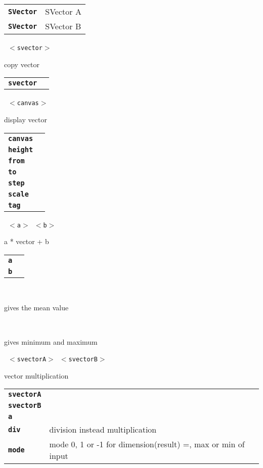 \begin{description}
\begin{description}
      \begin{tabular}{ll}
 \texttt{\textbf{SVector}} &  SVector A \\
 \texttt{\textbf{SVector}} &  SVector B \\
      \end{tabular}
       \texttt{ $<$svector$>$} \

        copy vector

      \begin{tabular}{ll}
 \texttt{\textbf{svector}} &  \\
      \end{tabular}
       \texttt{ $<$canvas$>$      } \

        display vector

      \begin{tabular}{ll}
 \texttt{\textbf{canvas}} &  \\
 \texttt{\textbf{height}} &    \\
 \texttt{\textbf{from}} &      \\
 \texttt{\textbf{to}} &        \\
 \texttt{\textbf{step}} &      \\
 \texttt{\textbf{scale}} &     \\
 \texttt{\textbf{tag}} &       \\
      \end{tabular}
       \texttt{ $<$a$>$ $<$b$>$} \

        a * vector + b

      \begin{tabular}{ll}
 \texttt{\textbf{a}} &     \\
 \texttt{\textbf{b}} &     \\
      \end{tabular}
       \texttt{} \

        gives the mean value

       \texttt{} \

        gives minimum and maximum

       \texttt{ $<$svectorA$>$ $<$svectorB$>$   } \

        vector multiplication

      \begin{tabular}{ll}
 \texttt{\textbf{svectorA}} &  \\
 \texttt{\textbf{svectorB}} &  \\
 \texttt{\textbf{a}} &            \\
 \texttt{\textbf{div}} &        division instead multiplication  \\
 \texttt{\textbf{mode}} &       mode 0, 1 or -1 for dimension(result) =, max or min of input  \\
      \end{tabular}
       \texttt{} \


\end{description}
\end{description}
